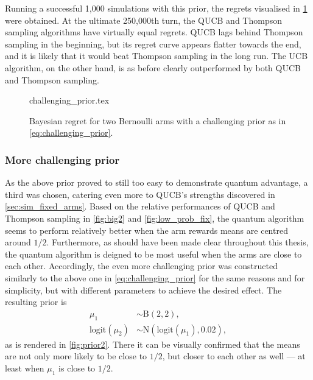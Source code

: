 Running a successful 1,000 simulations with this prior, the regrets visualised in \cref{fig:random2} were obtained.
At the ultimate 250,000th turn, the QUCB and Thompson sampling algorithms have virtually equal regrets.
QUCB lags behind Thompson sampling in the beginning, but its regret curve appears flatter towards the end, and it is likely that it would beat Thompson sampling in the long run.
The UCB algorithm, on the other hand, is as before clearly outperformed by both QUCB and Thompson sampling.

\begin{figure}[t]
    \centering
    \newcommand{\myoptions}{
        width=10cm,
        height=8cm,
        xlabel={Kiloturn},
        ylabel={Regret},
        legend entries={UCB, QUCB, Thompson},
        legend pos=north west,
        legend cell align=left,
        mystyle,
        ymax = 400,
    }
    {challenging_prior.tex}
    \caption[
        Bayesian regret for two Bernoulli arms, challenging prior.
    ]
    {
        Bayesian regret for two Bernoulli arms with a challenging prior as in \cref{eq:challenging_prior}.
    }
    \label{fig:random2}
\end{figure}

\clearpage

\subsubsection{More challenging prior}
As the above prior proved to still too easy to demonstrate quantum advantage, a third was chosen, catering even more to QUCB's strengths discovered in \cref{sec:sim_fixed_arms}.
Based on the relative performances of QUCB and Thompson sampling in \cref{fig:big2} and \cref{fig:low_prob_fix}, the quantum algorithm seems to perform relatively better when the arm rewards means are centred around $1/2$.
Furthermore, as should have been made clear throughout this thesis, the quantum algorithm is deigned to be most useful when the arms are close to each other.
Accordingly, the even more challenging prior was constructed similarly to the above one in \cref{eq:challenging_prior} for the same reasons and for simplicity, but with different parameters to achieve the desired effect.
The resulting prior is
\begin{equation}
    \label{eq:more_challenging_prior}
    \begin{aligned}
        \mu_1               & \sim \text{B}(2, 2),                      \\
        \text{logit}(\mu_2) & \sim \text{N}(\text{logit}(\mu_1), 0.02),
    \end{aligned}
\end{equation}
as is rendered in \cref{fig:prior2}.
There it can be visually confirmed that the means are not only more likely to be close to $1/2$, but closer to each other as well — at least when $\mu_1$ is close to $1/2$.

